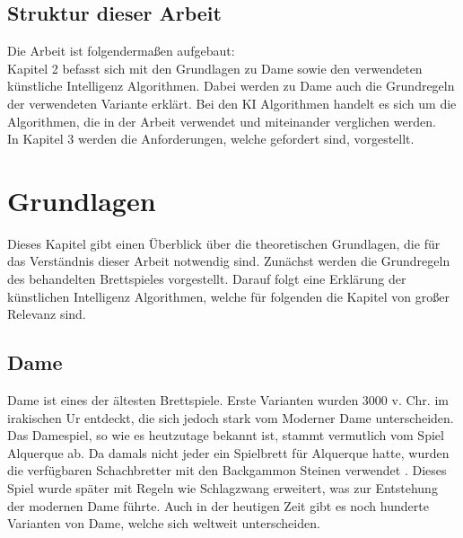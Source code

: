 \documentclass[12pt,a4paper,bibliography=totocnumbered,listof=totocnumbered]{article}
\begin{document}
\subsection{Struktur dieser Arbeit}
Die Arbeit ist folgendermaßen aufgebaut: \\
Kapitel 2 befasst sich mit den Grundlagen zu Dame sowie den verwendeten 
künstliche Intelligenz Algorithmen. Dabei werden zu Dame auch die Grundregeln der
verwendeten Variante erklärt. Bei den KI Algorithmen handelt es sich um die Algorithmen, die in 
der Arbeit verwendet und miteinander verglichen werden. \\
In Kapitel 3 werden die Anforderungen, welche gefordert sind, vorgestellt.

\pagebreak
\section{Grundlagen}
\label{chap:Grundlagen}
Dieses Kapitel gibt einen Überblick über die theoretischen Grundlagen, die für das Verständnis 
dieser Arbeit notwendig sind. Zunächst werden die Grundregeln des behandelten Brettspieles 
vorgestellt. Darauf folgt eine Erklärung der künstlichen Intelligenz Algorithmen, welche für 
folgenden die Kapitel von großer Relevanz sind. \cite{KuenstlicheIntelligenzNorvig}

\subsection{Dame}
Dame ist eines der ältesten Brettspiele. Erste Varianten wurden 3000 v. Chr. im irakischen Ur
entdeckt, die sich jedoch stark vom Moderner Dame unterscheiden. Das Damespiel, so wie es heutzutage 
bekannt ist, stammt vermutlich vom Spiel Alquerque ab. Da damals nicht jeder ein Spielbrett für Alquerque 
hatte, wurden die verfügbaren Schachbretter mit den Backgammon Steinen verwendet \cite{SpieleDerWelt}.
Dieses Spiel wurde später mit Regeln wie Schlagzwang erweitert, was zur Entstehung der modernen Dame führte.
Auch in der heutigen Zeit gibt es noch hunderte Varianten von Dame, welche sich weltweit unterscheiden.
\end{document}
